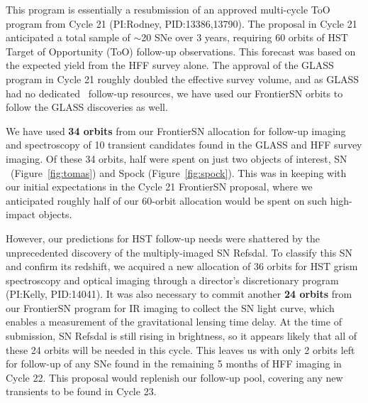 \documentclass[12pt]{article}
\begin{document}

%
%
\duplications           %

This program is essentially a resubmission of an approved multi-cycle
ToO program from Cycle 21 (PI:Rodney, PID:13386,13790). The proposal
in Cycle 21 anticipated a total sample of $\sim$20 SNe over 3 years,
requiring 60 orbits of HST Target of Opportunity (ToO) follow-up
observations.  This forecast was based on the expected yield from the
HFF survey alone.  The approval of the GLASS program in Cycle 21
roughly doubled the effective survey volume, and as GLASS had no
dedicated \HST\ follow-up resources, we have used our FrontierSN orbits
to follow the GLASS discoveries as well.

We have used {\bf 34 orbits} from our FrontierSN allocation for follow-up
imaging and spectroscopy of 10 transient candidates found in the GLASS
and HFF survey imaging.  Of these 34 orbits, half were spent on just
two objects of interest, SN \tomas\ (Figure~\ref{fig:tomas}) and Spock
(Figure~\ref{fig:spock}).  This was in keeping with our initial
expectations in the Cycle 21 FrontierSN proposal, where we anticipated
roughly half of our 60-orbit allocation would be spent on such
high-impact objects.

However, our predictions for HST follow-up needs were shattered by the
unprecedented discovery of the multiply-imaged SN Refsdal.  To
classify this SN and confirm its redshift, we acquired a new
allocation of 36 orbits for HST grism spectroscopy and optical imaging
through a director's discretionary program (PI:Kelly, PID:14041).  It
was also necessary to commit another {\bf 24 orbits} from our
FrontierSN program for IR imaging to collect the SN light curve, which
enables a measurement of the gravitational lensing time delay. At the
time of submission, SN Refsdal is still rising in brightness, so it
appears likely that all of these 24 orbits will be needed in this
cycle.  This leaves us with only 2 orbits left for follow-up of any
SNe found in the remaining 5 months of HFF imaging in Cycle 22. This
proposal would replenish our follow-up pool, covering any new
transients to be found in Cycle 23.



%
%
%
\end{document}
